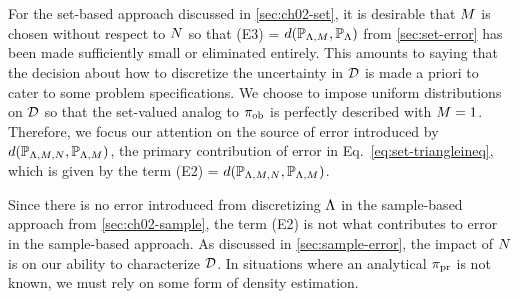 For the set-based approach discussed in \ref{sec:ch02-set}, it is desirable that $M$ is chosen without respect to $N$ so that (E3) = $d(\mathbb{P}_{{\Lambda}, M}, \operatorname*{\mathbb{P}_{{\Lambda}}})$ from \ref{sec:set-error} has been made sufficiently small or eliminated entirely.
This amounts to saying that the decision about how to discretize the uncertainty in $\mathcal{D}$ is made a priori to cater to some problem specifications.
We choose to impose uniform distributions on $\mathcal{D}$ so that the set-valued analog to $\operatorname*{\pi_{ob}}$ is perfectly described with $M=1$.
Therefore, we focus our attention on the source of error introduced by $d(\mathbb{P}_{{\Lambda}, M, N}, \mathbb{P}_{{\Lambda}, M} )$, the primary contribution of error in Eq.~\eqref{eq:set-triangleineq}, which is given by the term (E2) = $d(\mathbb{P}_{{\Lambda}, M, N}, \mathbb{P}_{{\Lambda}, M})$.

Since there is no error introduced from discretizing ${\Lambda}$ in the sample-based approach from \ref{sec:ch02-sample}, the term (E2) is not what contributes to error in the sample-based approach.
As discussed in \ref{sec:sample-error}, the impact of $N$ is on our ability to characterize $\mathcal{D}$.
In situations where an analytical $\operatorname*{\pi_{pr}}$ is not known, we must rely on some form of density estimation.




